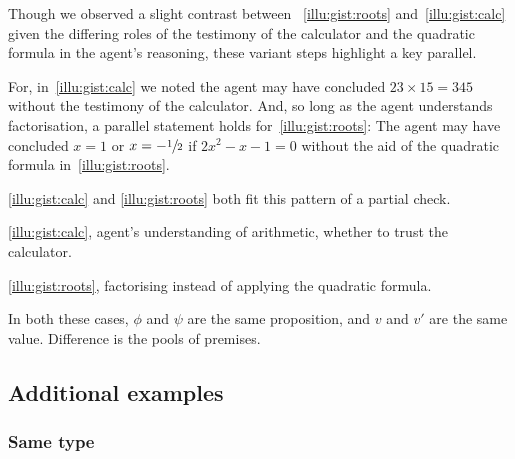 \begin{note}
  \color{red}
  Though we observed a slight contrast between ~\ref{illu:gist:roots} and~\ref{illu:gist:calc} given the differing roles of the testimony of the calculator and the quadratic formula in the agent's reasoning, these variant steps highlight a key parallel.

  For, in~\autoref{illu:gist:calc} we noted the agent may have concluded \(23 \times 15 = 345\) without the testimony of the calculator.
  And, so long as the agent understands factorisation, a parallel statement holds for~\ref{illu:gist:roots}:
  The agent may have concluded \(x = 1\) or \(x = -\sfrac{1}{2}\) if \(2x^{2} - x - 1 = 0\) without the aid of the quadratic formula in~\autoref{illu:gist:roots}.
\end{note}

\begin{note}
   \ref{illu:gist:calc} and \ref{illu:gist:roots} both fit this pattern of a partial check.

  \autoref{illu:gist:calc}, agent's understanding of arithmetic, whether to trust the calculator.

  \autoref{illu:gist:roots}, factorising instead of applying the quadratic formula.

  In both these cases, \(\phi\) and \(\psi\) are the same proposition, and \(v\) and \(v'\) are the same value.
  Difference is the pools of premises.
\end{note}

\subsection{Additional examples}

\subsubsection{Same type}

